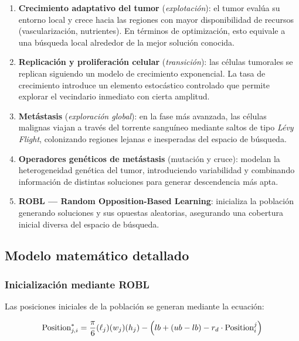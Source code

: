 \begin{enumerate}[label=\textbf{\arabic*.}]
  \item \textbf{Crecimiento adaptativo del tumor} (\emph{explotación}): el tumor evalúa su
    entorno local y crece hacia las regiones con mayor disponibilidad de recursos (vascularización,
    nutrientes). En términos de optimización, esto equivale a una búsqueda local alrededor
    de la mejor solución conocida.

  \item \textbf{Replicación y proliferación celular} (\emph{transición}): las células tumorales
    se replican siguiendo un modelo de crecimiento exponencial. La tasa de crecimiento
    introduce un elemento estocástico controlado que permite explorar el vecindario inmediato
    con cierta amplitud.

  \item \textbf{Metástasis} (\emph{exploración global}): en la fase más avanzada, las células
    malignas viajan a través del torrente sanguíneo mediante saltos de tipo \emph{Lévy Flight},
    colonizando regiones lejanas e inesperadas del espacio de búsqueda.

  \item \textbf{Operadores genéticos de metástasis} (mutación y cruce): modelan la heterogeneidad
    genética del tumor, introduciendo variabilidad y combinando información de distintas
    soluciones para generar descendencia más apta.

  \item \textbf{ROBL — Random Opposition-Based Learning}: inicializa la población generando
    soluciones y sus opuestas aleatorias, asegurando una cobertura inicial diversa del
    espacio de búsqueda.
\end{enumerate}

\subsection{Modelo matemático detallado}

\subsubsection{Inicialización mediante ROBL}

Las posiciones iniciales de la población se generan mediante la ecuación:

\begin{equation}
  \label{eq:robl}
  \text{Position}^*_{j,i} = \frac{\pi}{6}(\ell_j)(w_j)(h_j)
    - \Bigl(lb + (ub - lb) - r_d \cdot \text{Position}^j_i\Bigr)
\end{equation}

